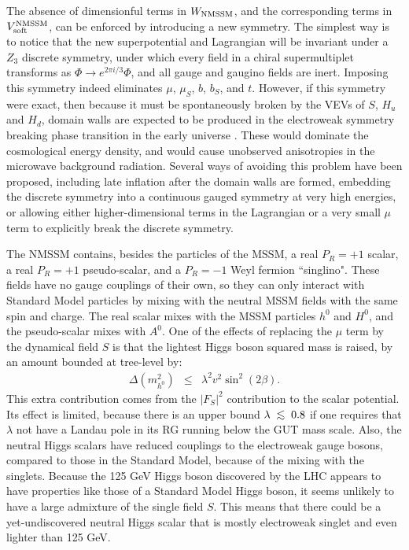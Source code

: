 \documentclass[12pt]{article}
\def\beq{\begin{eqnarray}}
\def\eeq{\end{eqnarray}}
\def\centeron#1#2{{\setbox0=\hbox{#1}\setbox1=\hbox{#2}\ifdim
\wd1>\wd0\kern.5\wd1\kern-.5\wd0\fi
\copy0\kern-.5\wd0\kern-.5\wd1\copy1\ifdim\wd0>\wd1
\kern.5\wd0\kern-.5\wd1\fi}}
\def\ltap{\;\centeron{\raise.35ex\hbox{$<$}}{\lower.65ex\hbox{$\sim$}}\;}
\def\lsim{\mathrel{\ltap}}
\begin{document}
The absence of dimensionful terms in $W_{\rm NMSSM}$, and the
corresponding terms in $V_{\rm soft}^{\rm NMSSM}$, can be enforced by
introducing a new symmetry. The simplest way is to notice that the new
superpotential and Lagrangian will be invariant under a $Z_3$ discrete
symmetry, under which every field in a chiral supermultiplet transforms as
$\Phi \rightarrow e^{2 \pi i/3} \Phi$, and all gauge and gaugino fields
are inert. Imposing this symmetry indeed eliminates $\mu$, $\mu_S$, $b$,
$b_S$, and $t$. However, if this symmetry were exact, then because it must
be spontaneously broken by the VEVs of $S$, $H_u$ and $H_d$, domain walls
are expected to be produced in the electroweak symmetry breaking phase
transition in the early universe \cite{NMSSMdomainwalls}. These would
dominate the cosmological energy density, and would cause unobserved
anisotropies in the microwave background radiation. Several ways of
avoiding this problem have been proposed, including late inflation after
the domain walls are formed, embedding the discrete symmetry into a
continuous gauged symmetry at very high energies, or allowing either
higher-dimensional terms in the Lagrangian or a very small $\mu$ term to
explicitly break the discrete symmetry. 

The NMSSM contains, besides the particles of the MSSM, a real $P_R=+1$ 
scalar, a real $P_R=+1$ pseudo-scalar, and a $P_R=-1$ Weyl fermion 
``singlino". These fields have no gauge couplings of their own, so they 
can only interact with Standard Model particles by mixing with the neutral 
MSSM fields with the same spin and charge. The real scalar mixes with the 
MSSM particles $h^0$ and $H^0$, and the pseudo-scalar mixes with $A^0$. 
One of the effects of replacing the $\mu$ term by the dynamical field $S$ 
is that the lightest Higgs boson squared mass is raised, by an amount bounded 
at tree-level by:
\beq
\Delta(m_{h^0}^2) &\leq& \lambda^2 v^2 \sin^2 (2 \beta).
\eeq
This extra contribution comes from the $|F_S|^2$ contribution to 
the scalar potential. Its effect is limited, because there is an upper bound 
$\lambda \lsim 0.8$ if one 
requires that $\lambda$ not have a Landau pole in its RG running below the 
GUT mass scale.  
Also, the neutral Higgs scalars have reduced couplings to the electroweak 
gauge bosons, compared to those in the Standard Model, because of the 
mixing with the singlets. Because the 125 GeV Higgs boson discovered by the LHC
appears to have properties like those of a Standard Model Higgs boson, it seems unlikely 
to have a large admixture of the single field $S$. This means that there could be
a yet-undiscovered neutral Higgs scalar that is mostly electroweak singlet and
even lighter than 125 GeV.
\end{document}
